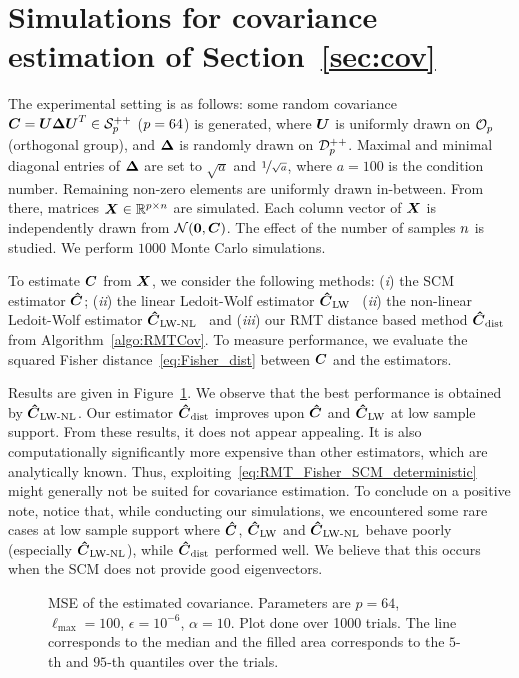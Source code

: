\section{Simulations for covariance estimation of Section~\ref{sec:cov}}
\label{app:simu_RMTCov}
The experimental setting is as follows: some random covariance $\boldsymbol{C}=\boldsymbol{U}\boldsymbol{\Delta}\boldsymbol{U}^T\in\mathcal{S}^{++}_{p}$ ($p=64$) is generated, where $\boldsymbol{U}$ is uniformly drawn on $\mathcal{O}_{p}$ (orthogonal group), and $\boldsymbol{\Delta}$ is randomly drawn on $\mathcal{D}^{++}_{p}$.
Maximal and minimal diagonal entries of $\boldsymbol{\Delta}$ are set to $\sqrt{a}$ and $\nicefrac{1}{\sqrt{a}}$, where $a=100$ is the condition number.
Remaining non-zero elements are uniformly drawn in-between.
%
From there, matrices $\boldsymbol{X}\in\mathbb{R}^{p\times n}$ are simulated.
Each column vector of $\boldsymbol{X}$ is independently drawn from $\mathcal{N}(\boldsymbol{0},\boldsymbol{C})$.
The effect of the number of samples $n$ is studied.
We perform $1000$ Monte Carlo simulations.

To estimate $\boldsymbol{C}$ from $\boldsymbol{X}$, we consider the following methods:
(\emph{i}) the SCM estimator $\boldsymbol{\hat{C}}$;
(\emph{ii}) the linear Ledoit-Wolf estimator $\boldsymbol{\hat{C}}_{\textup{LW}}$~\cite{ledoit2004well}
(\emph{ii}) the non-linear Ledoit-Wolf estimator $\boldsymbol{\hat{C}}_{\textup{LW-NL}}$~\cite{ledoit2020analytical}
and (\emph{iii}) our RMT distance based method $\boldsymbol{\hat{C}}_{\textup{dist}}$ from Algorithm~\ref{algo:RMTCov}.
%
To measure performance, we evaluate the squared Fisher distance~\eqref{eq:Fisher_dist} between $\boldsymbol{C}$ and the estimators.

Results are given in Figure~\ref{fig:cov_simu}.
We observe that the best performance is obtained by $\boldsymbol{\hat{C}}_{\textup{LW-NL}}$.
Our estimator $\boldsymbol{\hat{C}}_{\textup{dist}}$ improves upon $\boldsymbol{\hat{C}}$ and $\boldsymbol{\hat{C}}_{\textup{LW}}$ at low sample support.
From these results, it does not appear appealing.
It is also computationally significantly more expensive than other estimators, which are analytically known.
%
Thus, exploiting~\eqref{eq:RMT_Fisher_SCM_deterministic} might generally not be suited for covariance estimation.
%
To conclude on a positive note, notice that, while conducting our simulations, we encountered some rare cases at low sample support where $\boldsymbol{\hat{C}}$, $\boldsymbol{\hat{C}}_{\textup{LW}}$ and $\boldsymbol{\hat{C}}_{\textup{LW-NL}}$ behave poorly (especially $\boldsymbol{\hat{C}}_{\textup{LW-NL}}$), while $\boldsymbol{\hat{C}}_{\textup{dist}}$ performed well.
We believe that this occurs when the SCM does not provide good eigenvectors.

\begin{figure}[hb!]
    \centering
    
    \caption{MSE of the estimated covariance. Parameters are $p=64$, $\ell_{\mathrm{max}}=100$, $\epsilon=10^{-6}$, $\alpha=10$. Plot done over 1000 trials. The line corresponds to the median and the filled area corresponds to the $5$-th and $95$-th quantiles over the trials.}
    \label{fig:cov_simu}
\end{figure}


